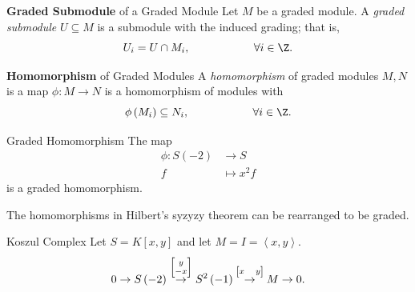 \documentclass[co439]{subfiles}
\begin{document}
    \rruleline

    \begin{definition}{\textbf{Graded Submodule} of a Graded Module}
        Let $M$ be a graded module. A \emph{graded submodule} $U\subseteq M$ is a submodule with the induced grading; that is,
        \begin{equation*}
            U_i = U\cap M_i,\hspace{2cm}\forall i\in\Z.
        \end{equation*}
    \end{definition}

    \begin{definition}{\textbf{Homomorphism} of Graded Modules}
        A \emph{homomorphism} of graded modules $M,N$ is a map $\phi:M\to N$ is a homomorphism of modules with
        \begin{equation*}
            \phi\left( M_i \right)\subseteq N_i, \hspace{2cm}\forall i\in\Z.
        \end{equation*}
    \end{definition}

    \begin{example}{Graded Homomorphism}
        The map
        \begin{equation*}
            \begin{aligned}
                \phi:S\left( -2 \right)&\to S \\
                f&\mapsto x^{2}f
            \end{aligned} 
        \end{equation*}
        is a graded homomorphism.
    \end{example}

    \begin{prop}{}
        The homomorphisms in Hilbert's syzyzy theorem can be rearranged to be graded.
    \end{prop}

    \rruleline
    
    \begin{example}{Koszul Complex}
        Let $S=K\left[ x,y \right]$ and let $M=I=\left< x,y \right>$. 
        \begin{equation*}
            0\to S\left( -2 \right)\overset{\scriptsize\begin{bmatrix} y\\-x\end{bmatrix}}{\to} S^{2}\left( -1 \right) \overset{\scriptsize\begin{bmatrix} x & y \end{bmatrix}}{\to} M \to 0.
        \end{equation*}
    \end{example}
    
\end{document}
